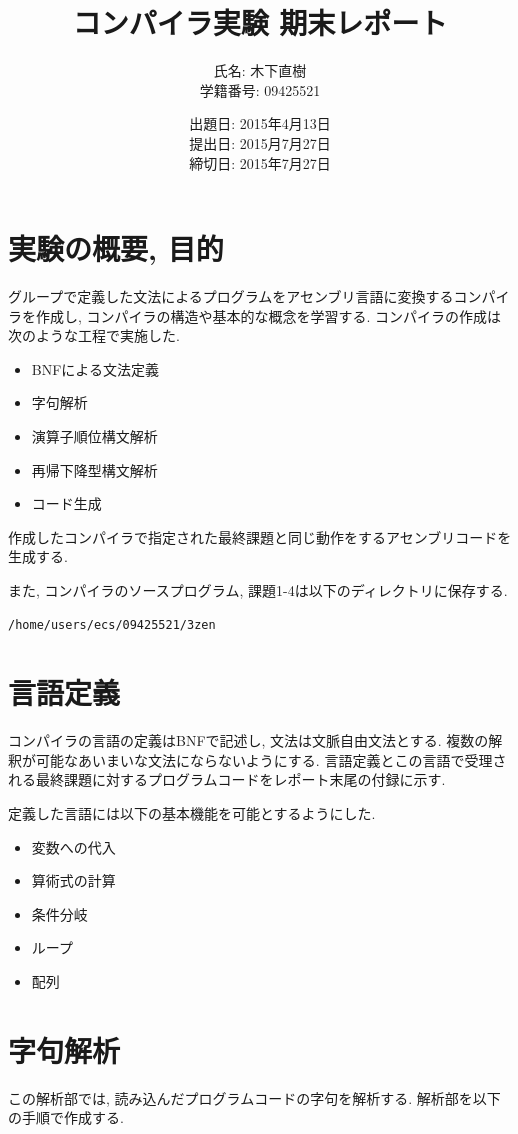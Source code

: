 \documentclass[a4j]{jarticle}
\title{コンパイラ実験 期末レポート}
\author{氏名: 木下直樹\\学籍番号: 09425521}
\date{出題日: 2015年4月13日\\提出日: 2015月7月27日\\締切日: 2015年7月27日}
\begin{document}
\maketitle

\section{実験の概要, 目的}
グループで定義した文法によるプログラムをアセンブリ言語に変換するコンパイラを作成し, コンパイラの構造や基本的な概念を学習する. 
コンパイラの作成は次のような工程で実施した.　
\begin{itemize}
\item BNFによる文法定義
\item 字句解析
\item 演算子順位構文解析
\item 再帰下降型構文解析
\item コード生成
\end{itemize}
作成したコンパイラで指定された最終課題と同じ動作をするアセンブリコードを生成する. 

また, コンパイラのソースプログラム, 課題1-4は以下のディレクトリに保存する.
\begin{verbatim}
/home/users/ecs/09425521/3zen
\end{verbatim}

\section{言語定義}
コンパイラの言語の定義はBNFで記述し, 文法は文脈自由文法とする. 複数の解釈が可能なあいまいな文法にならないようにする. 
言語定義とこの言語で受理される最終課題に対するプログラムコードをレポート末尾の付録に示す.

定義した言語には以下の基本機能を可能とするようにした.
\begin{itemize}
\item 変数への代入
\item 算術式の計算
\item 条件分岐
\item ループ
\item 配列
\end{itemize}

\section{字句解析}
この解析部では, 読み込んだプログラムコードの字句を解析する. 
解析部を以下の手順で作成する. 
\end{document}
